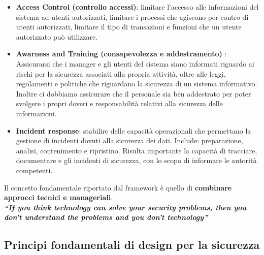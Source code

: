 \documentclass[12pt]{article}
\begin{document}
				\begin{itemize}
					\item \textbf{Access Control (controllo accessi)}: limitare l'accesso alle informazioni del sistema ad utenti autorizzati, limitare i processi che agiscono per contro di utenti autorizzati, limitare il tipo di transazioni e funzioni che un utente autorizzato può utilizzare.
					\item \textbf{Awarness and Training (consapevolezza e addestramento) }: Assicurarsi che i manager e gli utenti del sistema siano informati riguardo ai rischi per la sicurezza associati alla propria attività, oltre alle leggi, regolamenti e politiche che riguardano la sicurezza di un sistema informativo. Inoltre ci dobbiamo assicurare che il personale sia ben addestrato per poter svolgere i propri doveri e responsabilità relativi alla sicurezza delle informazioni.
					\item \textbf{Incident response}: stabilire delle capacità operazionali che permettano la gestione di incidenti dovuti alla sicurezza dei dati. Include: preparazione, analisi, contenimento e ripristino. Risulta importante la capacità di tracciare, documentare e gli incidenti di sicurezza, con lo scopo di informare le autorità competenti.
				\end{itemize}
				Il concetto fondamentale riportato dal framework è quello di \textbf{combinare approcci tecnici e manageriali}.\\
				
				\textit{\textbf{“If you think technology can solve your security problems, then you 
					don’t understand the problems and you don’t technology”} }
		\subsection{Principi fondamentali di design per la sicurezza}
		
\end{document}
